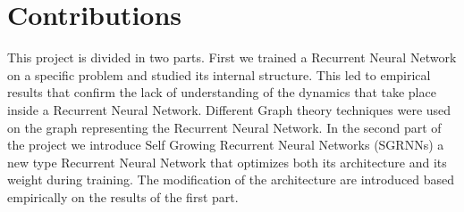 \section{Contributions}
This project is divided in two parts. First we trained a Recurrent Neural Network on a specific problem and studied its internal structure. This led to empirical results that confirm the lack of understanding of the dynamics that take place inside a Recurrent Neural Network. Different Graph theory techniques were used on the graph representing the Recurrent Neural Network. In the second part of the project we introduce Self Growing Recurrent Neural Networks (SGRNNs) a new type Recurrent Neural Network that optimizes both its architecture and its weight during training. The modification of the architecture are introduced based empirically on the results of the first part. 

